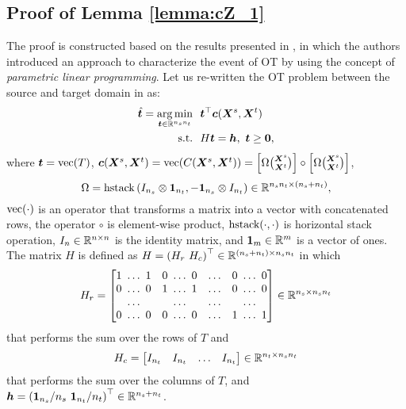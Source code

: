 
\subsection{Proof of Lemma \ref{lemma:cZ_1}} \label{appx:proof_lemma_cZ_1}



The proof is constructed based on the results presented in \cite{duy2021exact}, in which the authors introduced an approach to characterize the event of OT by using the concept of \emph{parametric linear programming}.
%
Let us re-written the OT problem between the source and target domain in  as:
%
\begin{align*}
	\hat{\bm t} = \operatorname*{arg\,min} \limits_{\bm t \in \mathbb{R}^{n_s n_t}} ~~ & 
	\bm t^\top \bm c(\bm X^s, \bm X^t) \\
	\text{s.t.} ~~
	& H \bm t = \bm h, ~\bm t \geq \bm 0, \nonumber
\end{align*}
%
where $\bm t = {\rm {vec}}(T)$,
%
$
	\bm c(\bm X^s, \bm X^t) 
	= {\rm {vec}} (C(\bm X^s, \bm X^t)) 
	= \left [ \Omega {\bm X^s \choose \bm X^t} \right] \circ \left [ \Omega {\bm X^s \choose \bm X^t} \right]
$,
\[
\Omega = {\rm hstack}\left ( 
	I_{n_s} \otimes \bm 1_{n_t}, - \bm 1_{n_s} \otimes I_{n_t} \right ) 
\in \mathbb{R}^{n_s n_t \times (n_s + n_t)},
\]
${\rm vec}(\cdot)$ is an operator that transforms a matrix into a vector with concatenated rows, the operator $\circ$ is element-wise product, $\rm hstack(\cdot, \cdot)$ is horizontal stack operation, $I_n \in \mathbb{R}^{n \times n}$ is the identity matrix, and $\bm 1_m \in \mathbb{R}^m$ is a vector of ones.
%
The matrix $H$ is defined as 
$ H = \left( H_r ~ H_c \right )^\top \in \mathbb{R}^{(n_s + n_t) \times n_s n_t}$ in which 
%
\begin{align*}
	H_r = 
	\begin{bmatrix}
		1 ~ \ldots ~  1 & 0 ~ \ldots ~  0 & \ldots & 0 ~ \ldots ~  0 \\
		0 ~ \ldots ~  0 & 1 ~ \ldots ~  1 & \ldots & 0 ~ \ldots ~  0 \\
		 ~ \ldots ~   &  ~ \ldots ~   & \ldots &  ~ \ldots ~   \\
		0 ~ \ldots ~  0 & 0 ~ \ldots ~  0 & \ldots & 1 ~ \ldots ~  1 \\
	\end{bmatrix} \in \mathbb{R}^{n_s \times n_s n_t}
\end{align*} 
%
that performs the sum over the rows of $T$ and 
%
\begin{align*}
	 H_c = 
	\begin{bmatrix}
		I_{n_t} & I_{n_t} & \ldots & I_{n_t}
	\end{bmatrix} \in \mathbb{R}^{n_t \times n_s n_t}
\end{align*}
%
that performs the sum over the columns of $T$, and $\bm h = \left (\bm 1_{n_s}/{n_s} ~ \bm 1_{n_t}/{n_t} \right)^\top \in \mathbb{R}^{n_s + n_t}$.

